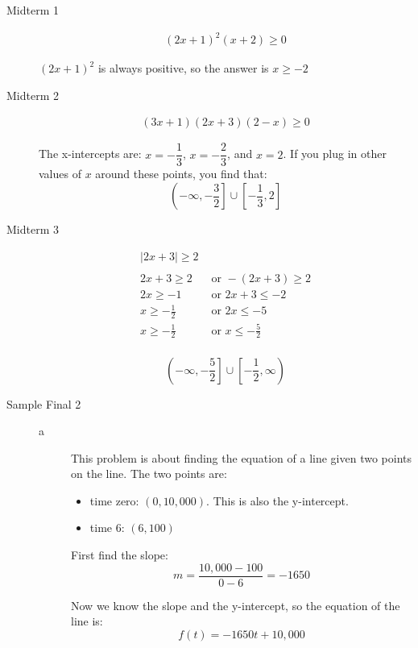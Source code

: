 \documentclass[fleqn,addpoints]{exam}
\begin{document}
\begin{description}
\item[Midterm 1]

\begin{align*}
  (2x+1)^2(x+2) \geq 0
\end{align*}

$(2x+1)^2$ is always positive, so the answer is $x \geq -2$

\item[Midterm 2]
\begin{align*}
  (3x+1)(2x+3)(2-x) \geq 0
\end{align*}

The x-intercepts are: $x = -\dfrac{1}{3}$, $x = -\dfrac{2}{3}$, and $x=2$.  If you plug in other values of $x$ around
these points, you find that:
\[
  \left(-\infty, -\frac{3}{2} \right] \cup \left[- \frac{1}{3}, 2 \right ]
\]

\item[Midterm 3]
\begin{align*}
  |2x+3| \geq 2 \\
  \\
  2x+3 \geq 2 & \text{ or } -(2x+3) \geq 2 \\
  2x \geq -1 & \text{ or } 2x+3 \leq -2 \\
  x \geq -\frac{1}{2} & \text{ or } 2x \leq -5 \\
  x \geq -\frac{1}{2} & \text{ or } x \leq -\frac{5}{2} \\
\end{align*}

\[
  \left( -\infty, -\frac{5}{2} \right] \cup \left[-\frac{1}{2}, \infty \right)
\]

\item[Sample Final 2]

\begin{description}

\item[a]
This problem is about finding the equation of a line given two points on the line.  The two points are:

\begin{itemize}
  \item time zero: $(0, 10,000)$.  This is also the y-intercept.
  \item time 6: $(6, 100)$
\end{itemize}

First find the slope:
\[
  m = \frac{10,000 - 100}{0-6} = -1650
\]

Now we know the slope and the y-intercept, so the equation of the line is:
\[
  f(t) = -1650t + 10,000
\]


\end{description}
\end{description}
\end{document}
